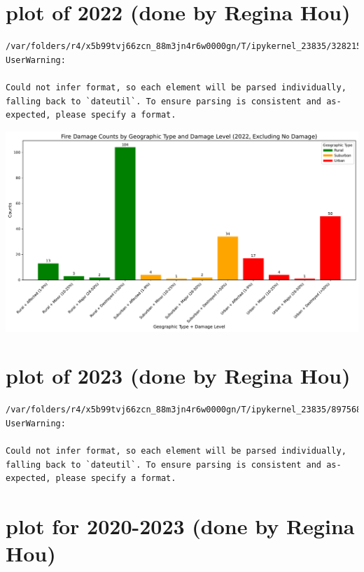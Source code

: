 \documentclass[
  letterpaper,
  DIV=11,
  numbers=noendperiod]{scrartcl}
\begin{document}
\section{plot of 2022 (done by Regina
Hou)}\label{plot-of-2022-done-by-regina-hou}

\begin{verbatim}
/var/folders/r4/x5b99tvj66zcn_88m3jn4r6w0000gn/T/ipykernel_23835/3282159924.py:2: UserWarning:

Could not infer format, so each element will be parsed individually, falling back to `dateutil`. To ensure parsing is consistent and as-expected, please specify a format.
\end{verbatim}

\includegraphics{Final Writeup_files/figure-pdf/cell-16-output-1.pdf}

\section{plot of 2023 (done by Regina
Hou)}\label{plot-of-2023-done-by-regina-hou}

\begin{verbatim}
/var/folders/r4/x5b99tvj66zcn_88m3jn4r6w0000gn/T/ipykernel_23835/897568859.py:2: UserWarning:

Could not infer format, so each element will be parsed individually, falling back to `dateutil`. To ensure parsing is consistent and as-expected, please specify a format.
\end{verbatim}

\section{plot for 2020-2023 (done by Regina
Hou)}\label{plot-for-2020-2023-done-by-regina-hou}
\end{document}
